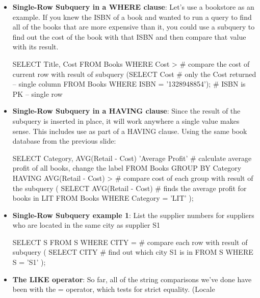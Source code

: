 \documentclass{report}
\begin{document}
\begin{itemize}
        \item \textbf{Single-Row Subquery in a WHERE clause}: Let’s use a bookstore as an example. If you knew the ISBN of a book and wanted to run a query to find all of the books that are more expensive than it, you could use a subquery to find out the cost of the book with that ISBN and then compare that value with its result.
            \bigbreak \noindent 
            \begin{sqlcode}
            SELECT Title, Cost
                FROM Books
                WHERE Cost > # compare the cost of current row with result of subquery
                    (SELECT Cost # only the Cost returned -- single column
                    FROM Books
                    WHERE ISBN = '1328948854'); # ISBN is PK -- single row
            \end{sqlcode}
        \item \textbf{Single-Row Subquery in a HAVING clause}: Since the result of the subquery is inserted in place, it will work anywhere a single value makes sense. This includes use as part of a HAVING clause. Using the same book database from the previous slide:
            \bigbreak \noindent 
            \begin{sqlcode}
                SELECT Category,
                    AVG(Retail - Cost) 'Average Profit' # calculate average profit of all books, change the label
                    FROM Books
                    GROUP BY Category
                    HAVING AVG(Retail - Cost) > # compare cost of each group with result of the subquery
                        ( SELECT AVG(Retail - Cost) # finds the average profit for books in LIT
                        FROM Books
                        WHERE Category = 'LIT' );
            \end{sqlcode}
        \item \textbf{Single-Row Subquery example 1}: List the supplier numbers for suppliers who are located in the same city as supplier S1
            \bigbreak \noindent 
            \begin{sqlcode}
                SELECT S
                    FROM S
                    WHERE CITY = # compare each row with result of subquery
                        ( SELECT CITY # find out which city S1 is in
                        FROM S
                        WHERE S = 'S1' );
                    \end{sqlcode}
        \item \textbf{The LIKE operator}: So far, all of the string comparisons we’ve done have been with the = operator, which tests for strict equality. (Locale

\end{itemize}
\end{document}

